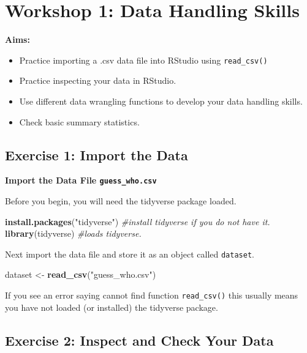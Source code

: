 \documentclass[
]{book}
\newenvironment{Shaded}{\begin{snugshade}}{\end{snugshade}}
\newcommand{\CommentTok}[1]{\textcolor[rgb]{0.56,0.35,0.01}{\textit{#1}}}
\newcommand{\FunctionTok}[1]{\textcolor[rgb]{0.13,0.29,0.53}{\textbf{#1}}}
\newcommand{\NormalTok}[1]{#1}
\newcommand{\OtherTok}[1]{\textcolor[rgb]{0.56,0.35,0.01}{#1}}
\newcommand{\StringTok}[1]{\textcolor[rgb]{0.31,0.60,0.02}{#1}}
\let\oldsection\section
\renewcommand{\section}{\needspace{5\baselineskip}\oldsection}
\begin{document}
\chapter{Workshop 1: Data Handling Skills}\label{workshop-1-data-handling-skills}

\textbf{Aims:}

\begin{itemize}
\item
  Practice importing a .csv data file into RStudio using \texttt{read\_csv()}
\item
  Practice inspecting your data in RStudio.
\item
  Use different data wrangling functions to develop your data handling skills.
\item
  Check basic summary statistics.
\end{itemize}

\section{Exercise 1: Import the Data}\label{exercise-1-import-the-data}

\textbf{Import the Data File \texttt{guess\_who.csv}}

Before you begin, you will need the tidyverse package loaded.

\begin{Shaded}
\begin{Highlighting}[]
\FunctionTok{install.packages}\NormalTok{(}\StringTok{"tidyverse"}\NormalTok{) }\CommentTok{\#install tidyverse if you do not have it.}
\FunctionTok{library}\NormalTok{(tidyverse) }\CommentTok{\#loads tidyverse.}
\end{Highlighting}
\end{Shaded}

Next import the data file and store it as an object called \texttt{dataset}.

\begin{Shaded}
\begin{Highlighting}[]
\NormalTok{dataset }\OtherTok{\textless{}{-}} \FunctionTok{read\_csv}\NormalTok{(}\StringTok{"guess\_who.csv"}\NormalTok{)}
\end{Highlighting}
\end{Shaded}

If you see an error saying cannot find function \texttt{read\_csv()} this usually means you have not loaded (or installed) the tidyverse package.

\section{Exercise 2: Inspect and Check Your Data}\label{exercise-2-inspect-and-check-your-data}
\end{document}
